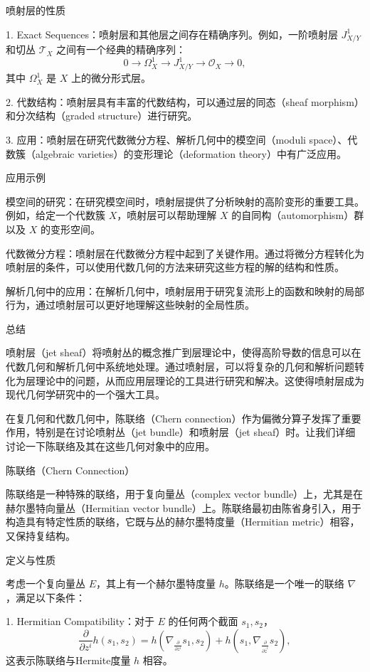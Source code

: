 \documentclass[lang=cn,12pt,fontset=none,a4paper]{beautybook}
\begin{document}
喷射层的性质

1. Exact Sequences：喷射层和其他层之间存在精确序列。例如，一阶喷射层 $J^1_{X/Y}$ 和切丛 $\mathcal{T}_X$ 之间有一个经典的精确序列：
   $$ 0 \to \Omega^1_X \to J^1_{X/Y} \to \mathcal{O}_X \to 0, $$
   其中 $\Omega^1_X$ 是 $X$ 上的微分形式层。

2. 代数结构：喷射层具有丰富的代数结构，可以通过层的同态（sheaf morphism）和分次结构（graded structure）进行研究。

3. 应用：喷射层在研究代数微分方程、解析几何中的模空间（moduli space）、代数簇（algebraic varieties）的变形理论（deformation theory）中有广泛应用。

应用示例

模空间的研究：在研究模空间时，喷射层提供了分析映射的高阶变形的重要工具。例如，给定一个代数簇 $X$，喷射层可以帮助理解 $X$ 的自同构（automorphism）群以及 $X$ 的变形空间。

代数微分方程：喷射层在代数微分方程中起到了关键作用。通过将微分方程转化为喷射层的条件，可以使用代数几何的方法来研究这些方程的解的结构和性质。

解析几何中的应用：在解析几何中，喷射层用于研究复流形上的函数和映射的局部行为，通过喷射层可以更好地理解这些映射的全局性质。

总结

喷射层（jet sheaf）将喷射丛的概念推广到层理论中，使得高阶导数的信息可以在代数几何和解析几何中系统地处理。通过喷射层，可以将复杂的几何和解析问题转化为层理论中的问题，从而应用层理论的工具进行研究和解决。这使得喷射层成为现代几何学研究中的一个强大工具。

在复几何和代数几何中，陈联络（Chern connection）作为偏微分算子发挥了重要作用，特别是在讨论喷射丛（jet bundle）和喷射层（jet sheaf）时。让我们详细讨论一下陈联络及其在这些几何对象中的应用。

 陈联络（Chern Connection）

陈联络是一种特殊的联络，用于复向量丛（complex vector bundle）上，尤其是在赫尔墨特向量丛（Hermitian vector bundle）上。陈联络最初由陈省身引入，用于构造具有特定性质的联络，它既与丛的赫尔墨特度量（Hermitian metric）相容，又保持复结构。

定义与性质

考虑一个复向量丛 $E$，其上有一个赫尔墨特度量 $h$。陈联络是一个唯一的联络 $\nabla$，满足以下条件：

1. Hermitian Compatibility：对于 $E$ 的任何两个截面 $s_1, s_2$，
   $$
   \frac{\partial}{\partial z^i} h(s_1, s_2) = h(\nabla_{\frac{\partial}{\partial z^i}} s_1, s_2) + h(s_1, \nabla_{\frac{\partial}{\partial \overline{z}^i}} s_2),
   $$
   这表示陈联络与Hermite度量 $h$ 相容。
\end{document}
